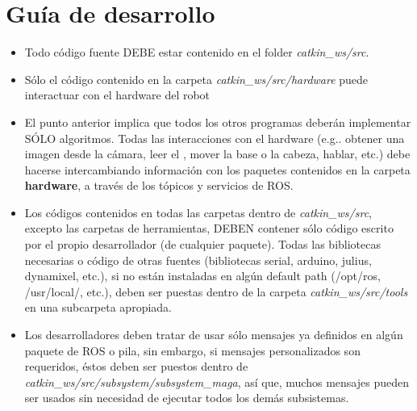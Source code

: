 \documentclass[a4paper,usenames,dvipsnames,svgnames,table]{book}
\begin{document}
\section{Guía de desarrollo}
\begin{itemize}
 \item Todo código fuente DEBE estar contenido en el folder \textit{catkin\_ws/src}.\\
 
 \item Sólo el código contenido en la carpeta \textit{catkin\_ws/src/hardware} puede interactuar con el 
 hardware del robot\\
 
 \item El punto anterior implica que todos los otros programas deberán implementar SÓLO algoritmos. 
 Todas las interacciones con el hardware (e.g.. obtener una imagen desde la cámara, leer el , 
 mover la base o la cabeza, hablar, etc.) debe hacerse intercambiando información con los paquetes
 contenidos en la carpeta \textbf{hardware}, a través de los tópicos y servicios de ROS.
 
 \item Los códigos contenidos en todas las carpetas dentro de \textit{catkin\_ws/src}, excepto las carpetas de 
 herramientas, DEBEN contener sólo código escrito por el propio desarrollador (de cualquier paquete).
 Todas las bibliotecas necesarias o código de otras fuentes (bibliotecas serial, arduino, julius,
 dynamixel, etc.), si no están instaladas en algún default path (/opt/ros, /usr/local/, etc.), deben 
 ser puestas dentro de la carpeta \textit{catkin\_ws/src/tools} en una subcarpeta apropiada.\\
 
 \item Los desarrolladores deben tratar de usar sólo mensajes ya definidos en algún paquete de ROS o
 pila, sin embargo, si mensajes personalizados son requeridos, éstos deben ser puestos dentro de
 \textit{catkin\_ws/src/subsystem/subsystem\_maga}, así que, muchos mensajes pueden ser usados sin necesidad
 de ejecutar todos los demás subsistemas.\\
\end{itemize}
\end{document}
